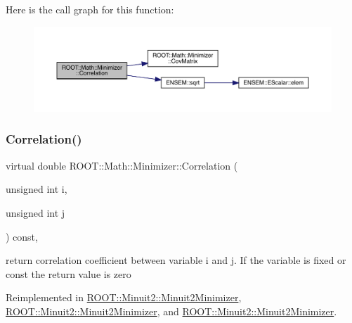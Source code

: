 Here is the call graph for this function\+:
\nopagebreak
\begin{figure}[H]
\begin{center}
\leavevmode
\includegraphics[width=350pt]{dc/dc4/classROOT_1_1Math_1_1Minimizer_a9ba2f4bc3c8c0e905f2c018e79809c0e_cgraph}
\end{center}
\end{figure}
\mbox{\label{classROOT_1_1Math_1_1Minimizer_a9ba2f4bc3c8c0e905f2c018e79809c0e}} 
\subsubsection{\texorpdfstring{Correlation()}{Correlation()}\hspace{0.1cm}{\footnotesize\ttfamily [2/3]}}
{\footnotesize\ttfamily virtual double R\+O\+O\+T\+::\+Math\+::\+Minimizer\+::\+Correlation (\begin{DoxyParamCaption}\item[{unsigned int}]{i,  }\item[{unsigned int}]{j }\end{DoxyParamCaption}) const\hspace{0.3cm}{\ttfamily [inline]}, {\ttfamily [virtual]}}

return correlation coefficient between variable i and j. If the variable is fixed or const the return value is zero 

Reimplemented in \mbox{\hyperlink{classROOT_1_1Minuit2_1_1Minuit2Minimizer_a229e82025189e72b5a03cb4e3be19f4a}{R\+O\+O\+T\+::\+Minuit2\+::\+Minuit2\+Minimizer}}, \mbox{\hyperlink{classROOT_1_1Minuit2_1_1Minuit2Minimizer_a229e82025189e72b5a03cb4e3be19f4a}{R\+O\+O\+T\+::\+Minuit2\+::\+Minuit2\+Minimizer}}, and \mbox{\hyperlink{classROOT_1_1Minuit2_1_1Minuit2Minimizer_a229e82025189e72b5a03cb4e3be19f4a}{R\+O\+O\+T\+::\+Minuit2\+::\+Minuit2\+Minimizer}}.


